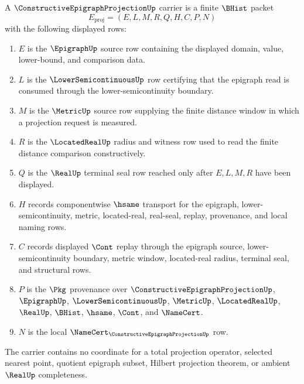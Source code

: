 \begin{definition}
\label{def:constructive-epigraph-projection-carrier}
A $\ConstructiveEpigraphProjectionUp$ carrier is a finite $\BHist$ packet
$$
E_{\mathrm{proj}}=(E,L,M,R,Q,H,C,P,N)
$$
with the following displayed rows:
\begin{enumerate}
\item $E$ is the $\EpigraphUp$ source row containing the displayed domain, value, lower-bound, and comparison data.
\item $L$ is the $\LowerSemicontinuousUp$ row certifying that the epigraph read is consumed through the lower-semicontinuity boundary.
\item $M$ is the $\MetricUp$ source row supplying the finite distance window in which a projection request is measured.
\item $R$ is the $\LocatedRealUp$ radius and witness row used to read the finite distance comparison constructively.
\item $Q$ is the $\RealUp$ terminal seal row reached only after $E,L,M,R$ have been displayed.
\item $H$ records componentwise $\hsame$ transport for the epigraph, lower-semicontinuity, metric, located-real, real-seal, replay, provenance, and local naming rows.
\item $C$ records displayed $\Cont$ replay through the epigraph source, lower-semicontinuity boundary, metric window, located-real radius, terminal seal, and structural rows.
\item $P$ is the $\Pkg$ provenance over $\ConstructiveEpigraphProjectionUp$, $\EpigraphUp$, $\LowerSemicontinuousUp$, $\MetricUp$, $\LocatedRealUp$, $\RealUp$, $\BHist$, $\hsame$, $\Cont$, and $\NameCert$.
\item $N$ is the local $\NameCert_{\ConstructiveEpigraphProjectionUp}$ row.
\end{enumerate}
The carrier contains no coordinate for a total projection operator, selected nearest point, quotient epigraph subset, Hilbert projection theorem, or ambient $\RealUp$ completeness.
\end{definition}

